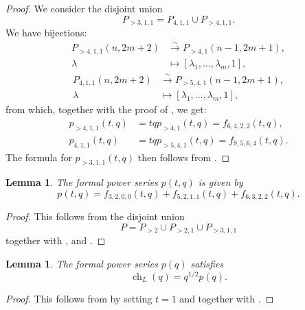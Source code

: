 \documentclass[a4paper, 12pt, reqno]{amsart}
\newtheorem{lemma}[theorem]{Lemma}
\theoremstyle{remark}
\DeclareMathOperator{\ch}{ch}
\begin{document}
\begin{proof}
  We consider the disjoint union
  \begin{equation*}
    P_{>3, 1, 1} = P_{4, 1, 1} \cup P_{>4, 1, 1}.
  \end{equation*}
  We have bijections:
  \begin{align*}
    P_{>4, 1, 1}(n, 2m + 2) &\xrightarrow{\sim} P_{>4, 1}(n - 1, 2m + 1), \\
    \lambda &\mapsto [\lambda_1, \dots, \lambda_m, 1],
  \end{align*}
  \begin{align*}
    P_{4, 1, 1}(n, 2m + 2) &\xrightarrow{\sim} P_{>5, 4, 1}(n - 1, 2m + 1), \\
    \lambda &\mapsto [\lambda_1, \dots, \lambda_m, 1],
  \end{align*}
  from which, together with the proof of , we get:
  \begin{align*}
    p_{>4, 1, 1}(t, q) &= tqp_{>4, 1}(t, q) = f_{6, 4, 2, 2}(t, q), \\
    p_{4, 1, 1}(t, q) &= tqp_{>5, 4, 1}(t, q) = f_{9, 5, 6, 4}(t, q).
  \end{align*}
  The formula for $p_{>3, 1, 1}(t, q)$ then follows from .
\end{proof}

\begin{lemma}
  \label{lmm:32}
  The formal power series $p(t, q)$ is given by
  \begin{equation*}
    p(t, q) = f_{3, 2, 0, 0}(t, q) + f_{5, 2, 1, 1}(t, q) + f_{6, 3, 2, 2}(t, q).
  \end{equation*}
\end{lemma}

\begin{proof}
  This follows from the disjoint union
  \begin{equation*}
    P = P_{>2} \cup P_{>2, 1} \cup P_{>3, 1, 1}
  \end{equation*}
  together with ,  and .
\end{proof}

\begin{lemma}
  \label{lmm:33}
  The formal power series $p(q)$ satisfies
  \begin{equation*}
    \ch_{L}(q) = q^{1/2}p(q).
  \end{equation*}
\end{lemma}

\begin{proof}
  This follows from  by setting $t = 1$ and \cite[Theorem 4]{andrews_singular_2022} together with .
\end{proof}
\end{document}

